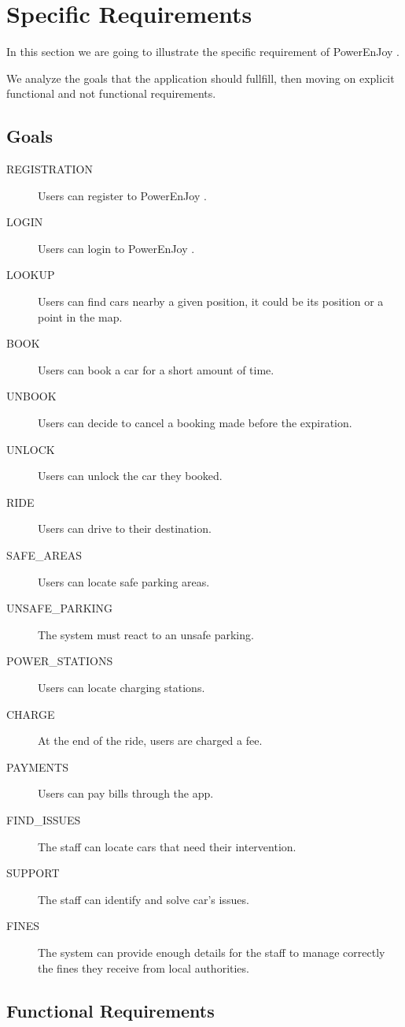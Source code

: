 \documentclass[11pt]{article} %
\newcommand{\pe}{PowerEnJoy }
\begin{document}
\newpage

\section{Specific Requirements}

In this section we are going to illustrate the specific requirement of \pe.

We analyze the goals that the application should fullfill, then moving on explicit functional and not functional requirements.

 \subsection{Goals}

 \begin{description}
 	\item[REGISTRATION] Users can register to \pe.
	\item[LOGIN] Users can login to \pe.
 	\item[LOOKUP] Users can find cars nearby a given position, it could be its position or a point in the map.
 	\item[BOOK] Users can book a car for a short amount of time.
 	\item[UNBOOK] Users can decide to cancel a booking made before the expiration.
 	\item[UNLOCK] Users can unlock the car they booked.
	\item[RIDE] Users can drive to their destination.
	\item[SAFE\_AREAS] Users can locate safe parking areas.
	\item[UNSAFE\_PARKING] The system must react to an unsafe parking.
	\item[POWER\_STATIONS] Users can locate charging stations.
	\item[CHARGE] At the end of the ride, users are charged a fee.
	\item[PAYMENTS] Users can pay bills through the app.
	\item[FIND\_ISSUES] The staff can locate cars that need their intervention.
	\item[SUPPORT] The staff can identify and solve car's issues.
	\item[FINES] The system can provide enough details for the staff to manage correctly the fines they receive from local authorities.
 \end{description}


\subsection{Functional Requirements}
\end{document}
